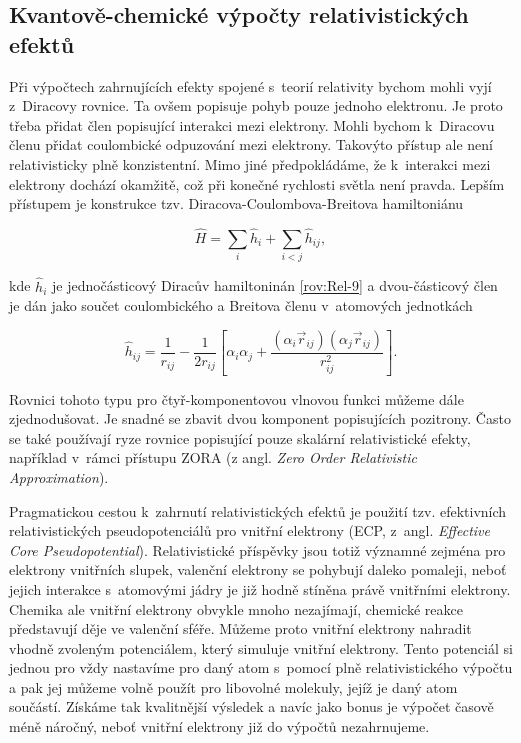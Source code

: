 \subsection{Kvantově-chemické výpočty relativistických efektů}

Při výpočtech zahrnujících efekty spojené s~teorií relativity bychom mohli vyjí z~Diracovy rovnice. Ta ovšem popisuje pohyb pouze jednoho elektronu. Je proto třeba přidat člen popisující interakci mezi elektrony. Mohli bychom k~Diracovu členu přidat coulombické odpuzování mezi elektrony. Takovýto přístup ale není relativisticky plně konzistentní. Mimo jiné předpokládáme, že k~interakci mezi elektrony dochází okamžitě, což při konečné rychlosti světla není pravda. Lepším přístupem je konstrukce tzv. Diracova-Coulombova-Breitova hamiltoniánu

\begin{equation}
\hat{H} = \sum_i \hat{h}_i + \sum_{i<j} \hat{h}_{ij},
\label{rov:Rel-12}
\end{equation}

\noindent kde $\hat{h}_i$ je jednočásticový Diracův hamiltoninán \eqref{rov:Rel-9} a dvou-částicový člen je dán jako součet coulombického a Breitova členu v~atomových jednotkách

\begin{equation}
\hat{h}_{ij} = \frac{1}{r_{ij}} - \frac{1}{2 r_{ij}} \left[ \alpha_i \alpha_j + \frac{(\alpha_i \vec{r}_{ij})(\alpha_j \vec{r}_{ij})}{r_{ij}^2} \right].
\label{rov:Rel-13}
\end{equation}

Rovnici tohoto typu pro čtyř-komponentovou vlnovou funkci můžeme dále zjednodušovat. Je snadné se zbavit dvou komponent popisujících pozitrony. Často se také používají ryze rovnice popisující pouze skalární relativistické efekty, například v~rámci přístupu ZORA (z angl. \textit{Zero Order Relativistic Approximation}).

Pragmatickou cestou k~zahrnutí relativistických efektů je použití tzv. efektivních relativistických pseudopotenciálů pro vnitřní elektrony (ECP, z~angl. \textit{Effective Core Pseudopotential}). Relativistické příspěvky jsou totiž významné zejména pro elektrony vnitřních slupek, valenční elektrony se pohybují daleko pomaleji, neboť jejich interakce s~atomovými jádry je již hodně stíněna právě vnitřními elektrony. Chemika ale vnitřní elektrony obvykle mnoho nezajímají, chemické reakce představují děje ve valenční sféře. Můžeme proto vnitřní elektrony nahradit vhodně zvoleným potenciálem, který simuluje vnitřní elektrony. Tento potenciál si jednou pro vždy nastavíme pro daný atom s~pomocí plně relativistického výpočtu a pak jej můžeme volně použít pro libovolné molekuly, jejíž je daný atom součástí. Získáme tak kvalitnější výsledek a navíc jako bonus je výpočet časově méně náročný, neboť vnitřní elektrony již do výpočtů nezahrnujeme.         
  
